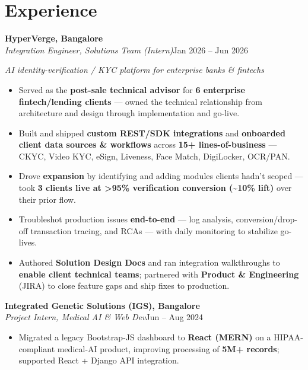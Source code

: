 \documentclass[10pt,a4paper]{article}
\begin{document}
\section*{Experience}
\vspace{1pt}\textbf{HyperVerge, Bangalore}\\
\textit{Integration Engineer, Solutions Team (Intern)}\hfill Jan 2026 -- Jun 2026\par\vspace{1pt}
{\small\itshape AI identity-verification / KYC platform for enterprise banks \& fintechs}\par\vspace{1pt}
\begin{itemize}
\item Served as the \textbf{post-sale technical advisor} for \textbf{6 enterprise fintech/lending clients} --- owned the technical relationship from architecture and design through implementation and go-live.
\item Built and shipped \textbf{custom REST/SDK integrations} and \textbf{onboarded client data sources \& workflows} across \textbf{15+ lines-of-business} --- CKYC, Video KYC, eSign, Liveness, Face Match, DigiLocker, OCR/PAN.
\item Drove \textbf{expansion} by identifying and adding modules clients hadn't scoped --- took \textbf{3 clients live at \textgreater{}95\% verification conversion (\textasciitilde{}10\% lift)} over their prior flow.
\item Troubleshot production issues \textbf{end-to-end} --- log analysis, conversion/drop-off transaction tracing, and RCAs --- with daily monitoring to stabilize go-lives.
\item Authored \textbf{Solution Design Docs} and ran integration walkthroughs to \textbf{enable client technical teams}; partnered with \textbf{Product \& Engineering} (JIRA) to close feature gaps and ship fixes to production.
\end{itemize}
\vspace{1pt}\textbf{Integrated Genetic Solutions (IGS), Bangalore}\\
\textit{Project Intern, Medical AI \& Web Dev}\hfill Jun -- Aug 2024\par\vspace{1pt}
\begin{itemize}
\item Migrated a legacy Bootstrap-JS dashboard to \textbf{React (MERN)} on a HIPAA-compliant medical-AI product, improving processing of \textbf{5M+ records}; supported React + Django API integration.
\end{itemize}
\end{document}
